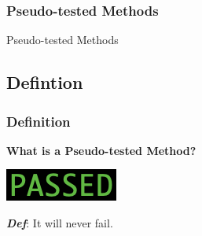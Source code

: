 \begin{frame}
	\frametitle{Pseudo-tested Methods}
	\begin{center}
    \huge{Pseudo-tested Methods}
  \end{center}
\end{frame}

\subsection{Defintion}
\begin{frame}
  \frametitle{Definition}
    \begin{center}
      \textbf{What is a Pseudo-tested Method?}

      \vspace{10mm}
      \includegraphics{images/passing}

      \vspace{10mm}
      \textbf{\textit{Def}}: It will never fail.
    \end{center}
\end{frame}
